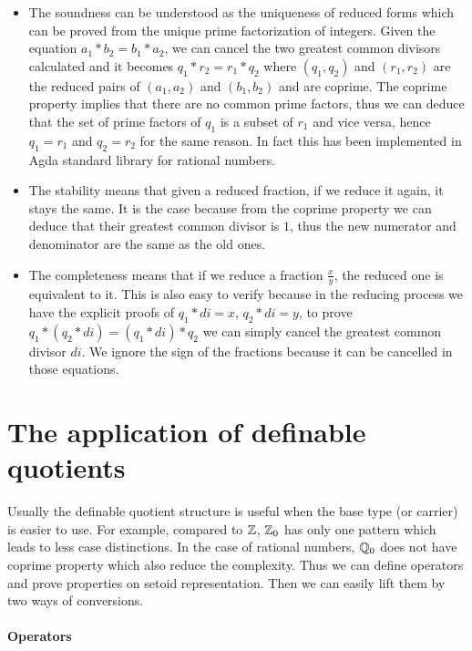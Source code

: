 \begin{itemize}
\item The soundness can be understood as the uniqueness of reduced forms which can be proved from the unique prime factorization of integers. Given the equation $a_1 * b_2 = b_1 * a_2$, we can cancel the two greatest common divisors calculated and it becomes $q_1 * r_2 = r_1 * q_2$ where $(q_1,q_2)$ and $(r_1,r_2)$ are the reduced pairs of $(a_1,a_2)$ and $(b_1,b_2)$ and are coprime.  The coprime property implies that there are no common prime factors, thus we can deduce that the set of prime factors of $q_1$ is a subset of $r_1$ and vice versa, hence $q_1 = r_1$ and $q_2 = r_2$ for the same reason. In fact this has been implemented in Agda standard library for rational numbers.

\item The stability means that given a reduced fraction, if we reduce it again, it stays the same. It is the case because from the coprime property we can deduce that their greatest common divisor is $1$, thus the new numerator and denominator are the same as the old ones.

\item The completeness means that if we reduce a fraction $\frac{x}{y}$, the reduced one is equivalent to it. This is also easy to verify because in the reducing process we have the explicit proofs of $q_1*di=x$, $q_2*di=y$, to prove $q_1 * (q_2 * di) = (q_1 *di) * q_2$ we can simply cancel the greatest common divisor $di$. We ignore the sign of the fractions because it can be cancelled in those equations.
\end{itemize}


\section{The application of definable quotients}

Usually the definable quotient structure is useful when the base type (or carrier) is easier to use.  For example, compared to $\mathbb{Z}$, $\mathbb{Z}_0$ has only one pattern which leads to less case distinctions.
In  the case of rational numbers, $\mathbb{Q}_0$ does not have coprime property which also reduce the complexity.
Thus we can define operators and prove properties on setoid representation. Then we can easily lift them by two ways of conversions.

\paragraph{Operators}

